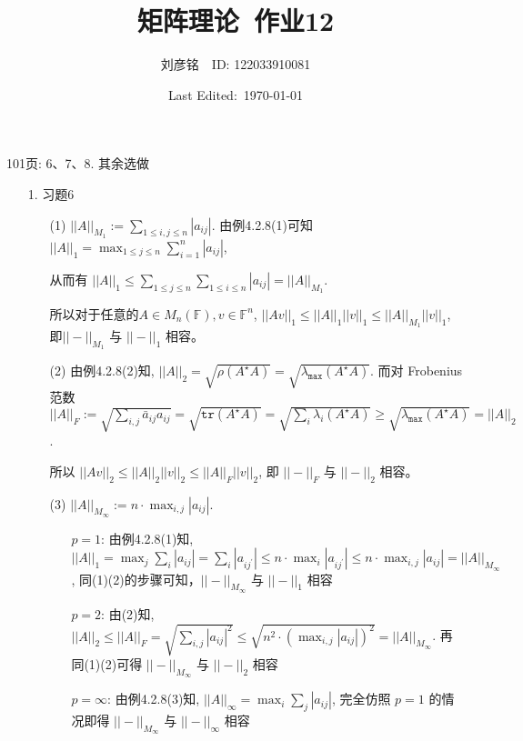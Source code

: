 \documentclass{article}
\title{矩阵理论\ 作业12}
\author{刘彦铭\ \ ID: 122033910081}
\date{Last Edited:\ \today}
\begin{document}
\maketitle

\begin{spacing}{1.5}

101页: 6、7、8. 其余选做
\begin{itemize}
    \item [1.] 习题6
    
    \begin{itemize}
        \item [(1)] $||A||_{M_1} := \sum_{1\leq i, j\leq n} |a_{ij}|$. 由例4.2.8(1)可知 $||A||_1 = \max_{1\leq j\leq n} \sum_{i=1}^{n} |a_{ij}|$, 
        
        从而有 $||A||_1 \leq \sum_{1\leq j\leq n}\sum_{1\leq i\leq n} |a_{ij}| = ||A||_{M_1}$.
        
        所以对于任意的$A\in M_{n}(\mathbb{F}), v\in\mathbb{F}^n$, $||Av||_1 \leq ||A||_1||v||_1 \leq ||A||_{M_1}||v||_1$, 即$||-||_{M_1}$ 与 $||-||_1$ 相容。

        \item [(2)] 由例4.2.8(2)知, $||A||_2 = \sqrt{\rho(A^\star A)} = \sqrt{\lambda_{\mathtt{max}}(A^\star A)}$. 而对 Frobenius 范数 $||A||_F := \sqrt{\sum_{i,j} \bar a_{ij}a_{ij}}=\sqrt{\mathtt{tr}(A^\star A)} = \sqrt{\sum_i \lambda_i(A^\star A)} \geq \sqrt{\lambda_{\mathtt{max}}(A^\star A)} = ||A||_2$.
        
        所以 $||Av||_2 \leq ||A||_2||v||_2 \leq ||A||_F||v||_2$, 即 $||-||_F$ 与 $||-||_2$ 相容。

        \item [(3)] $||A||_{M_\infty} := n\cdot \max_{i,j} |a_{ij}|$.
        \begin{itemize}
            \item [$p=1$:] 由例4.2.8(1)知, $||A||_1 = \max_{j} \sum_{i} |a_{ij}| = \sum_{i} |a_{ij^\prime}| \leq n\cdot \max_i |a_{ij^\prime}| \leq n\cdot \max_{i,j} |a_{ij}| = ||A||_{M_\infty}$, 同(1)(2)的步骤可知，$||-||_{M_\infty}$ 与 $||-||_1$ 相容
            \item [$p=2$:] 由(2)知, $||A||_2 \leq ||A||_F = \sqrt{\sum_{i,j} |a_{ij}|^2}\leq \sqrt{{n^2\cdot (\max_{i,j} |a_{ij}|)^2}} = ||A||_{M_\infty}$. 再同(1)(2)可得 $||-||_{M_\infty}$ 与 $||-||_2$ 相容
            \item [$p=\infty$:] 由例4.2.8(3)知, $||A||_\infty = \max_{i} \sum_{j} |a_{ij}|$, 完全仿照 $p=1$ 的情况即得 $||-||_{M_\infty}$ 与 $||-||_{\infty}$ 相容
        \end{itemize}
    \end{itemize}
    

\end{itemize}
\end{spacing}
\end{document}
